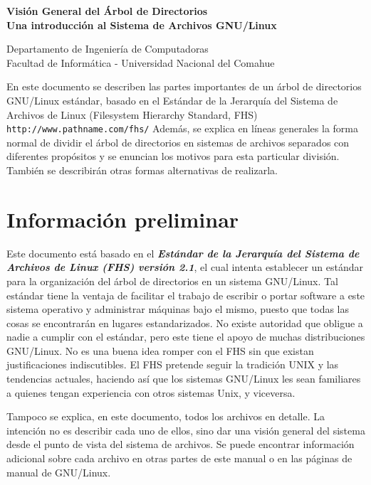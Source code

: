 \documentclass[12pt]{article}
\def\maketitle{

 \makeatletter
 {\color{bl} \centering \huge \sc \textbf{
Visión General del Árbol de Directorios \\
\large \vspace*{-8pt} \color{black} Una introducción al Sistema de Archivos GNU/Linux
 \vspace*{8pt} }\par}
 \makeatother


 \makeatletter
 {\centering \small 
 	Departamento de Ingeniería de Computadoras \\
 	Facultad de Informática - Universidad Nacional del Comahue \\
 	\vspace{20pt} }
 \makeatother

}
\begin{document}
\thispagestyle{empty}
\maketitle
\setlength{\parindent}{0pt}



En este documento se describen las partes importantes de un árbol de
directorios GNU/Linux estándar, basado en el Estándar de la Jerarquía del
Sistema de Archivos de Linux (Filesystem Hierarchy Standard, FHS) \texttt{http://www.pathname.com/fhs/}
 Además, se
explica en líneas generales la forma normal de dividir el árbol de directorios
en  sistemas de archivos separados con diferentes propósitos y se enuncian los
motivos para esta particular división. También se describirán otras formas
alternativas de realizarla.  

\section{ Información preliminar}

Este documento está basado en el \textbf{\textit{Estándar de la Jerarquía del
Sistema de Archivos de Linux (FHS) versión 2.1}}, el cual intenta
establecer un estándar para la organización del árbol de directorios en un
sistema GNU/Linux. Tal estándar tiene la ventaja de facilitar el trabajo de
escribir o portar software a este sistema operativo y administrar máquinas bajo
el mismo, puesto que todas las cosas se encontrarán en lugares estandarizados.
No existe autoridad que obligue a nadie a cumplir con el estándar, pero este
tiene el apoyo de muchas distribuciones GNU/Linux. No es una buena idea romper
con el FHS sin que existan justificaciones indiscutibles. El FHS pretende seguir
la tradición UNIX y las tendencias actuales, haciendo así que los sistemas
GNU/Linux les sean familiares a quienes tengan experiencia con otros sistemas
Unix, y viceversa.  



Tampoco se explica, en este documento, todos los archivos en detalle. La
intención no es describir cada uno de ellos, sino dar una visión general del
sistema desde el punto de vista del sistema de archivos.  Se puede encontrar
información adicional sobre cada archivo en otras partes de este manual o en las
páginas de manual de GNU/Linux.  
\end{document}
